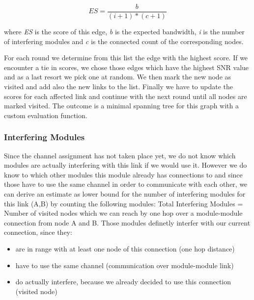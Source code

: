       \begin{equation} \label{eq:edgescore}
	ES=\frac{b}{(i + 1 )* (c + 1)}
      \end{equation}
      
      where \textit{ES} is the score of this edge, \textit{b} is the expected bandwidth, \textit{i} is the number of 
      interfering modules and \textit{c} is the connected count of the corresponding nodes.
      
      For each round we determine from this list the edge with the highest score. If we encounter a tie in scores, 
      we chose those edges which have the highest \ac{SNR} value and as a last
      resort we pick one at random. We then mark the new node as visited and add also the new links to the list.
      Finally we have to update the scores for each affected link and continue with the next round until all nodes are marked visited.
      The outcome is a minimal spanning tree for this graph with a custom evaluation function.
      
\newpage
      
      \subsubsection{Interfering Modules}
	Since the channel assignment has not taken place yet, we do not know which modules are actually interfering with this link if we would use it.
	However we do know to which other modules this module already has connections to and since those have to use the same channel in order to communicate with each
	other, we can derive an estimate as lower bound for the number of interfering modules for this link (A,B) by counting the following modules:
	Total Interfering Modules = Number of visited nodes which we can reach by one hop over a module-module connection from node A and B.
	Those modules definetly interfer with our current connection, since they:
	
	\begin{itemize}
	\item are in range with at least one node of this connection (one hop distance)
	
	\item have to use the same channel (communication over module-module link)
	
	\item do actually interfere, because we already decided to use this connection (visited node)
	\end{itemize}

